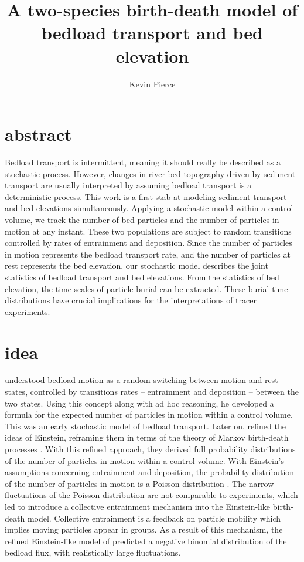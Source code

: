 \documentclass{article}
\begin{document}
\title{A two-species birth-death model of bedload transport and bed elevation}
\author{Kevin Pierce}
\maketitle
\section{abstract}
Bedload transport is intermittent, meaning it should really be described as a stochastic process. 
However, changes in river bed topography driven by sediment transport are usually interpreted by assuming bedload transport is a deterministic process. 
This work is a first stab at modeling sediment transport and bed elevations simultaneously. 
Applying a stochastic model within a control volume, we track the number of bed particles and the number of particles in motion at any instant. 
These two populations are subject to random transitions controlled by rates of entrainment and deposition. 
Since the number of particles in motion represents the bedload transport rate, and the number of particles at rest represents the bed elevation, our stochastic model describes the joint statistics of bedload transport and bed elevations. 
From the statistics of bed elevation, the time-scales of particle burial can be extracted. 
These burial time distributions have crucial implications for the interpretations of tracer experiments. 

\section{idea}
\citet{Einstein1950} understood bedload motion as a random switching between motion and rest states, controlled by transitions rates -- entrainment and deposition -- between the two states. 
Using this concept along with ad hoc reasoning, he developed a formula for the expected number of particles in motion within a control volume.
This was an early stochastic model of bedload transport.  
Later on, \citet{Ancey2006, Ancey2008, Heyman2013} refined the ideas of Einstein, reframing them in terms of the theory of Markov birth-death processes \citep[e.g.][]{Cox1965}. 
With this refined approach, they derived full probability distributions of the number of particles in motion within a control volume. 
With Einstein's assumptions concerning entrainment and deposition, the probability distribution of the number of particles in motion is a Poisson distribution \citep{Ancey2006}. 
The narrow fluctuations of the Poisson distribution are not comparable to experiments, which led \citet{Ancey2008} to introduce a collective entrainment mechanism into the Einstein-like birth-death model. 
Collective entrainment is a feedback on particle mobility which implies moving particles appear in groups. 
As a result of this mechanism, the refined Einstein-like model of \citet{Ancey2008} predicted a negative binomial distribution of the bedload flux, with realistically large fluctuations. 
\end{document}
